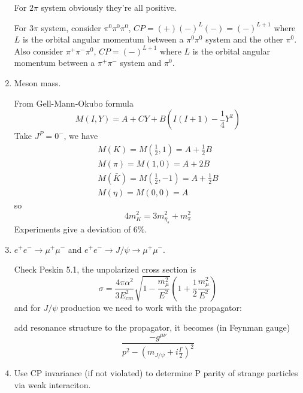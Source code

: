 \documentclass{article}
\renewcommand{\a}{\alpha}
\newcommand{\s}{\sigma}
\begin{document}
\begin{enumerate}[\bf1.]
  For $2\pi$ system obviously they're all positive.

  For $3\pi$ system, consider $\pi^0\pi^0\pi^0$, $CP=(+)(-)^L(-)=(-)^{L+1}$ where $L$ is the orbital angular momentum between a $\pi^0\pi^0$ system and the other $\pi^0$. Also consider $\pi^+\pi^-\pi^0$, $CP=(-)^{L+1}$ where $L$ is the orbital angular momentum between a $\pi^+\pi^-$ system and $\pi^0$.
  \item Meson mass.

  From Gell-Mann-Okubo formula
  $$M(I,Y)=A+CY+B(I(I+1)-\frac{1}{4}Y^2)$$
  Take $J^P=0^-$, we have
  \begin{align*}
	M(K)=M(\frac{1}{2},1)=A+\frac{1}{2}B\\
    M(\pi)=M(1,0)=A+2B\\
    M(\bar K)=M(\frac{1}{2},-1)=A+\frac{1}{2}B\\
    M(\eta)=M(0,0)=A
  \end{align*}
  so
  $$4m^2_K=3m_{\eta_s}^2+m_{\pi}^2$$
  Experiments give a deviation of $6\%$.
  \item $e^+e^-\rightarrow\mu^+\mu^-$ and $e^+e^-\rightarrow J/\psi\rightarrow\mu^+\mu^-$.

  Check Peskin 5.1, the unpolarized cross section is
  $$\s=\frac{4\pi\a^2}{3E_{cm}^2}\sqrt{1-\frac{m_{\mu}^2}{E^2}}(1+\frac{1}{2}\frac{m_{\mu}^2}{E^2})$$
  and for $J/\psi$ production we need to work with the propagator: 

  add resonance structure to the propagator, it becomes (in Feynman gauge)
  $$\frac{-g^{\mu\nu}}{p^2-(m_{J/\psi}+i\frac{\Gamma}{2})^2}$$
  \item Use CP invariance (if not violated) to determine P parity of strange particles via weak interaciton.
\end{enumerate}
\end{document}
